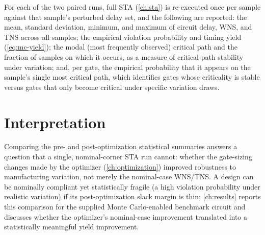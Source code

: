 For each of the two paired runs, full STA (\cref{ch:sta}) is re-executed
once per sample against that sample's perturbed delay set, and the
following are reported: the mean, standard deviation, minimum, and maximum
of circuit delay, WNS, and TNS across all samples; the empirical violation
probability and timing yield (\cref{eq:mc-yield}); the modal (most
frequently observed) critical path and the fraction of samples on which it
occurs, as a measure of critical-path stability under variation; and, per
gate, the empirical probability that it appears on the sample's single most
critical path, which identifies gates whose criticality is stable versus
gates that only become critical under specific variation draws.

\section{Interpretation}
\label{sec:mc-interpretation}

Comparing the pre- and post-optimization statistical summaries answers a
question that a single, nominal-corner STA run cannot: whether the
gate-sizing changes made by the optimizer (\cref{ch:optimization}) improved
robustness to manufacturing variation, not merely the nominal-case WNS/TNS.
A design can be nominally compliant yet statistically fragile (a high
violation probability under realistic variation) if its post-optimization
slack margin is thin; \cref{ch:results} reports this comparison for the
supplied Monte Carlo-enabled benchmark circuit and discusses whether the
optimizer's nominal-case improvement translated into a statistically
meaningful yield improvement.
